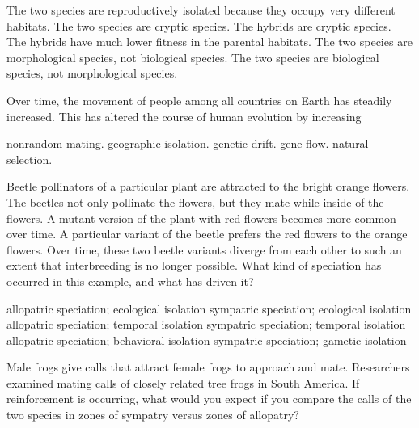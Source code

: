 \begin{choices}
\choice The two species are reproductively isolated because they occupy very different habitats.%
\choice The two species are cryptic species.%
\choice The hybrids are cryptic species.%
\correctchoice The hybrids have much lower fitness in the parental habitats.%
\choice The two species are morphological species, not biological species.%
\choice The two species are biological species, not morphological species.%
\end{choices}

\question
Over time, the movement of people among all countries on Earth has steadily increased. This has altered the course of human evolution by increasing

\begin{choices}
\choice nonrandom mating. %
\choice geographic isolation. %
\choice genetic drift. %
\correctchoice gene flow. %
\choice natural selection. %
\end{choices}

\question
Beetle pollinators of a particular plant are attracted to the bright orange flowers. The beetles not only pollinate the flowers, but they mate while inside of the flowers. A mutant version of the plant with red flowers becomes more common over time. A particular variant of the beetle prefers the red flowers to the orange flowers. Over time, these two beetle variants diverge from each other to such an extent that interbreeding is no longer possible. What kind of speciation has occurred in this example, and what has driven it?

\begin{choices}
\choice allopatric speciation; ecological isolation%
\correctchoice sympatric speciation; ecological isolation%
\choice allopatric speciation; temporal isolation%
\choice sympatric speciation; temporal isolation%
\choice allopatric speciation; behavioral isolation%
\choice sympatric speciation; gametic isolation%
\end{choices}

\question
Male frogs give calls that attract female frogs to approach and mate. Researchers examined mating calls of closely related tree frogs in South America. If reinforcement is occurring, what would you expect if you compare the calls of the two species in zones of sympatry versus zones of allopatry? 

